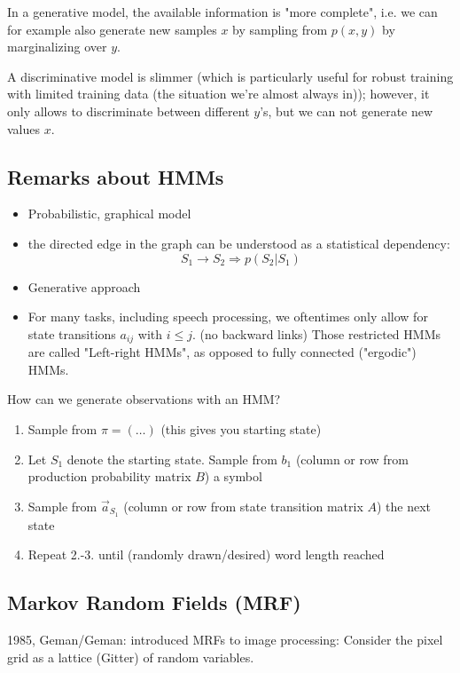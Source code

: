 \documentclass{scrartcl}
\begin{document}
In a generative model, the available information is "more complete", i.e. we can for example also generate new samples \(x\) by sampling from \(p(x,y)\) by marginalizing over \(y\).

A discriminative model is slimmer (which is particularly useful for robust training with limited training data (the situation we're almost always in)); however, it only allows to discriminate between different \(y\)'s, but we can not generate new values \(x\).

\subsection{Remarks about HMMs}
\begin{itemize}
    \item
        Probabilistic, graphical model
    \item
        the directed edge in the graph can be understood as a statistical dependency: \[S_1 \rightarrow S_2 \Rightarrow p(S_2|S_1)\]
    \item
        Generative approach
    \item
        For many tasks, including speech processing, we oftentimes only allow for state transitions \(a_{ij}\) with \(i \leq j\). (no backward links) Those restricted HMMs are called "Left-right HMMs", as opposed to fully connected ("ergodic") HMMs.
\end{itemize}

\medbreak
How can we generate observations with an HMM?
\begin{enumerate}
    \item
        Sample from \(\pi = (\dots)\) (this gives you starting state) 
    \item
        Let \(S_1\) denote the starting state. Sample from \(b_1\) (column or row from production probability matrix \(B\)) a symbol
    \item
        Sample from \(\vec{a}_{S_1}\) (column or row from state transition matrix \(A\)) the next state
    \item
        Repeat 2.-3. until (randomly drawn/desired) word length reached
\end{enumerate}

\subsection{Markov Random Fields (MRF)}
1985, Geman/Geman: introduced MRFs to image processing:  Consider the pixel grid as a lattice (Gitter) of random variables.
\end{document}
